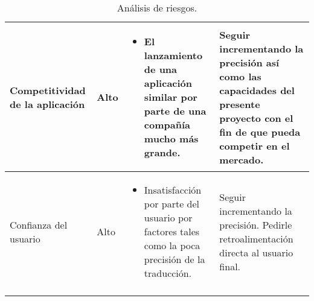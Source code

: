 \begin{center}
\begin{longtable}{|J{2.5cm}|J{2cm}|J{5cm}|J{5cm}|}
        \hline
        Competitividad de la aplicación         &
        \begin{center}
            Alto
        \end{center}                            &
        \begin{itemize}
            \item El lanzamiento de una aplicación similar por parte de una compañía mucho más grande.
        \end{itemize}                           &
        Seguir incrementando la precisión así como las capacidades del presente proyecto con el fin de que pueda competir en el mercado. \\
        
        \hline
        Confianza del usuario                   &
        \begin{center}
            Alto
        \end{center}                            &
        \begin{itemize}
            \item Insatisfacción por parte del usuario por factores tales como la poca precisión de la traducción.
        \end{itemize}                           &
        Seguir incrementando la precisión. Pedirle retroalimentación directa al usuario final. \\
        
        \hline
        
        \caption{Análisis de riesgos.}
        \label{tbl:analisis-riesgos}
        
    \end{longtable}
\end{center}